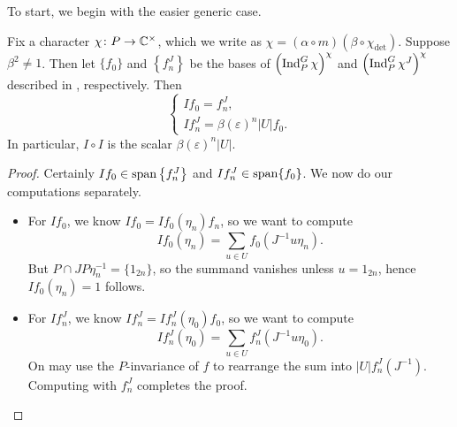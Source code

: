 To start, we begin with the easier generic case.
\begin{proposition} \label{prop:generic-intertwining}
	Fix a character $\chi\colon P\to\mathbb C^\times$, which we write as $\chi=(\alpha\circ m)(\beta\circ\chi_{\det})$. Suppose $\beta^2\ne1$. Then let $\{f_0\}$ and $\left\{f_n^J\right\}$ be the bases of $\left(\operatorname{Ind}_P^G\chi\right)^\chi$ and $\left(\operatorname{Ind}_P^G\chi^J\right)^\chi$ described in , respectively. Then
    \[\begin{cases}
        If_0=f_n^J, \\
        If_n^J=\beta(\varepsilon)^n\left|U\right|f_0.
    \end{cases}\]
	In particular, $I\circ I$ is the scalar $\beta(\varepsilon)^n\left|U\right|$.
\end{proposition}
\begin{proof}
	Certainly $If_0\in\operatorname{span}\left\{f_n^J\right\}$ and $If_n^J\in\operatorname{span}\{f_0\}$. We now do our computations separately.
    \begin{itemize}
        \item For $If_0$, we know $If_0=If_0(\eta_n)f_n$, so we want to compute
    	\[If_0(\eta_n)=\sum_{u\in U}f_0\left(J^{-1}u\eta_n\right).\]
        But $P\cap JP\eta_n^{-1}=\{1_{2n}\}$, so the summand vanishes unless $u=1_{2n}$, hence $If_0(\eta_n)=1$ follows.
        \item For $If_n^J$, we know $If_n^J=If_n^J(\eta_0)f_0$, so we want to compute
    	\[If_n^J(\eta_0)=\sum_{u\in U}f_n^J\left(J^{-1}u\eta_0\right).\]
        On may use the $P$-invariance of $f$ to rearrange the sum into $\left|U\right|f_n^J\left(J^{-1}\right)$. Computing with $f_n^J$ completes the proof.
        \qedhere
    \end{itemize}
\end{proof}
